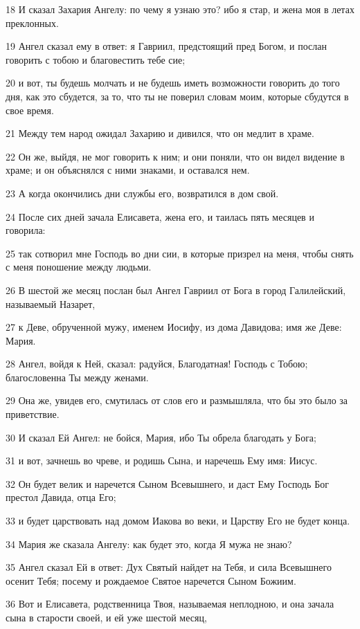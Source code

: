 \par 18 И сказал Захария Ангелу: по чему я узнаю это? ибо я стар, и жена моя в летах преклонных.
\par 19 Ангел сказал ему в ответ: я Гавриил, предстоящий пред Богом, и послан говорить с тобою и благовестить тебе сие;
\par 20 и вот, ты будешь молчать и не будешь иметь возможности говорить до того дня, как это сбудется, за то, что ты не поверил словам моим, которые сбудутся в свое время.
\par 21 Между тем народ ожидал Захарию и дивился, что он медлит в храме.
\par 22 Он же, выйдя, не мог говорить к ним; и они поняли, что он видел видение в храме; и он объяснялся с ними знаками, и оставался нем.
\par 23 А когда окончились дни службы его, возвратился в дом свой.
\par 24 После сих дней зачала Елисавета, жена его, и таилась пять месяцев и говорила:
\par 25 так сотворил мне Господь во дни сии, в которые призрел на меня, чтобы снять с меня поношение между людьми.
\par 26 В шестой же месяц послан был Ангел Гавриил от Бога в город Галилейский, называемый Назарет,
\par 27 к Деве, обрученной мужу, именем Иосифу, из дома Давидова; имя же Деве: Мария.
\par 28 Ангел, войдя к Ней, сказал: радуйся, Благодатная! Господь с Тобою; благословенна Ты между женами.
\par 29 Она же, увидев его, смутилась от слов его и размышляла, что бы это было за приветствие.
\par 30 И сказал Ей Ангел: не бойся, Мария, ибо Ты обрела благодать у Бога;
\par 31 и вот, зачнешь во чреве, и родишь Сына, и наречешь Ему имя: Иисус.
\par 32 Он будет велик и наречется Сыном Всевышнего, и даст Ему Господь Бог престол Давида, отца Его;
\par 33 и будет царствовать над домом Иакова во веки, и Царству Его не будет конца.
\par 34 Мария же сказала Ангелу: как будет это, когда Я мужа не знаю?
\par 35 Ангел сказал Ей в ответ: Дух Святый найдет на Тебя, и сила Всевышнего осенит Тебя; посему и рождаемое Святое наречется Сыном Божиим.
\par 36 Вот и Елисавета, родственница Твоя, называемая неплодною, и она зачала сына в старости своей, и ей уже шестой месяц,
